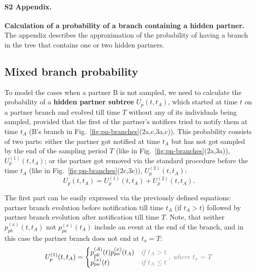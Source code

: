 \documentclass[10pt,letterpaper]{article}
\begin{document}
\paragraph*{S2 Appendix.}
\label{S2_Appendix}
{\bf Calculation of a probability of a branch containing a hidden partner.} The appendix describes the approximation of the probability of having a branch in the tree that contains one or two hidden partners.

\subsection*{Mixed branch probability}


To model the cases when a partner B is not sampled, we need to calculate the probability of a \textbf{hidden partner subtree} $U_p(t, t_A)$, which started at time $t$ on a partner branch and evolved till time $T$ without any of its individuals being sampled, provided that the first of the partner's notifiers tried to notify them at time $t_A$ (B's branch in Fig.~\ref{fig:pn-branches}(2a,c,3a,c)). This probability consists of two parts: either the partner got notified at time $t_A$ but has not got sampled by the end of the sampling period $T$ (like in Fig.~\ref{fig:pn-branches}(2a,3a)), $U_p^{(1)}(t, t_A)$;  or the partner got removed via the standard procedure before the time $t_A$ (like in Fig.~\ref{fig:pn-branches}(2c,3c)), $U_p^{(2)}(t, t_A)$: 
\begin{equation}
U_p(t, t_A) = U_p^{(1)}(t, t_A) + U_p^{(2)}(t, t_A).
\end{equation} 

The first part can be easily expressed via the previously defined equations: partner branch evolution before notification till time $t_A$ (if $t_A > t$) followed by partner branch evolution after notification till time $T$. Note, that neither  $p_{pb}^{(x)}(t, t_A)$ not $p_{pa}^{(x)}(t_A)$ include an event at the end of the branch, and in this case the partner branch does not end at $t_x = T$:
\begin{equation}
U_p^{(1)}(t, t_A) = 
\begin{cases}
p_{pb}^{(A)}(t) p_{pa}^{(x)}(t_A) & \textit{\color{gray} if $t_A > t$}\\
p_{pa}^{(x)}(t) & \textit{\color{gray} if $t_A \leq t$}
\end{cases}\textit{\color{gray}, where $t_x =T$}
\end{equation} 
\end{document}
